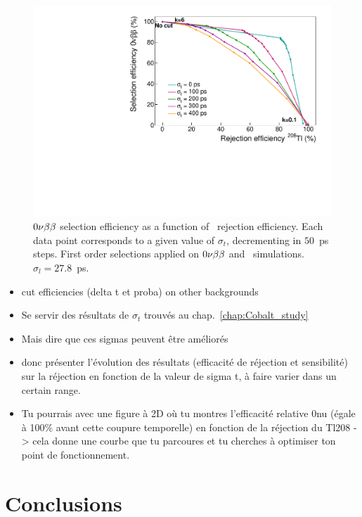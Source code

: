 \begin{figure}[!h]
  \centering
  \includegraphics[width=13cm]{timedifference/fig_timediff/compare_sigma_cut_proba.pdf}
  \caption{$0\nu\beta\beta$ selection efficiency as a function of \Tl\ rejection efficiency.
    Each data point corresponds to a given value of $\sigma_{t}$, decrementing in $50$~ps steps.
    First order selections applied on $0\nu\beta\beta$ and \Tl\ simulations.
    $\sigma_{l}=27.8$~ps.
    \label{fig:eff_cut_proba_sigma}}
\end{figure}

\begin{itemize}
\item cut efficiencies (delta t et proba) on other backgrounds
\item Se servir des résultats de $\sigma_{t}$ trouvés au chap.~\ref{chap:Cobalt_study}
\item Mais dire que ces sigmas peuvent être améliorés
\item donc présenter l'évolution des résultats (efficacité de réjection et sensibilité) sur la réjection en fonction de la valeur de sigma t, à faire varier dans un certain range.
\item Tu pourrais avec une figure à 2D où tu montres l'efficacité relative 0nu (égale à 100\% avant cette coupure temporelle) en fonction de la réjection du Tl208 -> cela donne une courbe que tu parcoures et tu cherches à optimiser ton point de fonctionnement.
\end{itemize}


\section{Conclusions}

